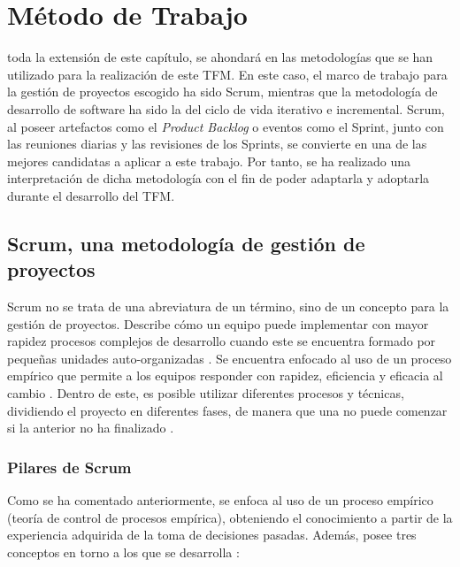 \chapter{Método de Trabajo}
\label{chap:metodo}

 toda la extensión de este capítulo, se ahondará en las metodologías que se han utilizado para la realización de este \acs{TFM}. En este caso, el marco de trabajo para la gestión de proyectos escogido ha sido Scrum, mientras que la metodología de desarrollo de software ha sido la del ciclo de vida iterativo e incremental. Scrum, al poseer artefactos como el \textit{Product Backlog} o eventos como el Sprint, junto con las reuniones diarias y las revisiones de los Sprints, se convierte en una de las mejores candidatas a aplicar a este trabajo. Por tanto, se ha realizado una interpretación de dicha metodología con el fin de poder adaptarla y adoptarla durante el desarrollo del \acs{TFM}.

\section{Scrum, una metodología de gestión de proyectos}
Scrum no se trata de una abreviatura de un término, sino de un concepto para la gestión de proyectos. Describe cómo un equipo puede implementar con mayor rapidez procesos complejos de desarrollo cuando este se encuentra formado por pequeñas unidades auto-organizadas \cite{robertmulsow2018}. Se encuentra enfocado al uso de un proceso empírico que permite a los equipos responder con rapidez, eficiencia y eficacia al cambio \cite{michelesliger}. Dentro de este, es posible utilizar diferentes procesos y técnicas, dividiendo el proyecto en diferentes fases, de manera que una no puede comenzar si la anterior no ha finalizado \cite{scrumguide}.

\subsection{Pilares de Scrum}
Como se ha comentado anteriormente, se enfoca al uso de un proceso empírico (teoría de control de procesos empírica), obteniendo el conocimiento a partir de la experiencia adquirida de la toma de decisiones pasadas. Además, posee tres conceptos en torno a los que se desarrolla \cite{scrumguide}:

